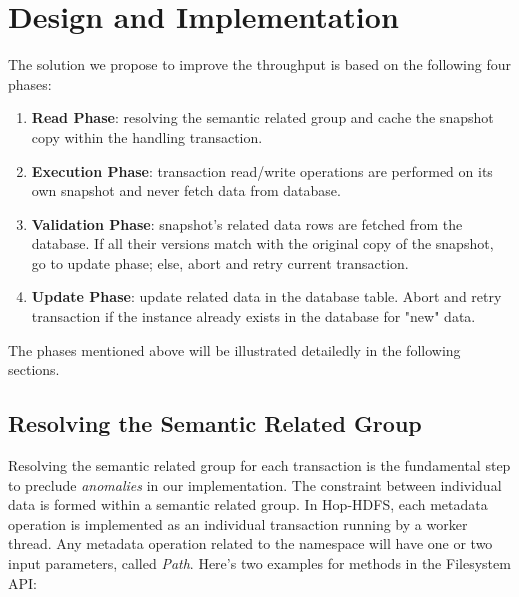 
%
%


\chapter{Design and Implementation}
The solution we propose to improve the throughput is based on the following four phases:
\begin{enumerate}[noitemsep]
	\item \textbf{Read Phase}: resolving the semantic related group and cache the snapshot copy within the handling transaction.
	\item \textbf{Execution Phase}: transaction read/write operations are performed on its own snapshot and never fetch data from database.
	\item \textbf{Validation Phase}: snapshot's related data rows are fetched from the database. If all their versions match with the original copy of the snapshot, go to update phase; else, abort and retry current transaction.
	\item \textbf{Update Phase}: update related data in the database table. Abort and retry transaction if the instance already exists in the database for "new" data.
\end{enumerate}
\label{ch:Design}

\noindent The phases mentioned above will be illustrated detailedly in the following sections.
\section{Resolving the Semantic Related Group}

Resolving the semantic related group for each transaction is the fundamental step to preclude \textit{anomalies} in our implementation. The constraint between individual data is formed within a semantic related group. In Hop-HDFS, each metadata operation is implemented as an individual transaction running by a worker thread. Any metadata operation related to the namespace will have one or two input parameters, called \textit{Path}. Here's two examples for methods in the Filesystem API:

